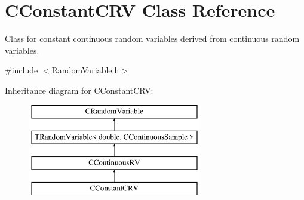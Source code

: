 \hypertarget{class_c_constant_c_r_v}{\section{C\-Constant\-C\-R\-V Class Reference}
\label{class_c_constant_c_r_v}
}


Class for constant continuous random variables derived from continuous random variables.  




{\ttfamily \#include $<$Random\-Variable.\-h$>$}

Inheritance diagram for C\-Constant\-C\-R\-V\-:\begin{figure}[H]
\begin{center}
\leavevmode
\includegraphics[height=4.000000cm]{class_c_constant_c_r_v}
\end{center}
\end{figure}
